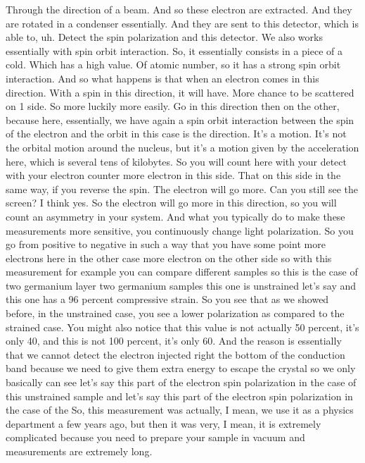 Through the direction of a beam. And so these electron are extracted. And they are rotated in a condenser essentially. And they are sent to this detector, which is able to, uh. Detect the spin polarization and this detector. We also works essentially with spin orbit interaction. So, it essentially consists in a piece of a cold. Which has a high value. Of atomic number, so it has a strong spin orbit interaction. And so what happens is that when an electron comes in this direction. With a spin in this direction, it will have. More chance to be scattered on 1 side. So more luckily more easily. Go in this direction then on the other, because here, essentially, we have again a spin orbit interaction between the spin of the electron and the orbit in this case is the direction. It's a motion. It's not the orbital motion around the nucleus, but it's a motion given by the acceleration here, which is several tens of kilobytes. So you will count here with your detect with your electron counter more electron in this side. That on this side in the same way, if you reverse the spin. The electron will go more. Can you still see the screen? I think yes. So the electron will go more in this direction, so you will count an asymmetry in your system. And what you typically do to make these measurements more sensitive, you continuously change light polarization. So you go from positive to negative in such a way that you have some point more electrons here in the other case more electron on the other side so with this measurement for example you can compare different samples so this is the case of two germanium layer two germanium samples this one is unstrained let's say and this one has a 96 percent compressive strain. So you see that as we showed before, in the unstrained case, you see a lower polarization as compared to the strained case. You might also notice that this value is not actually 50 percent, it's only 40, and this is not 100 percent, it's only 60. And the reason is essentially that we cannot detect the electron injected right the bottom of the conduction band because we need to give them extra energy to escape the crystal so we only basically can see let's say this part of the electron spin polarization in the case of this unstrained sample and let's say this part of the electron spin polarization in the case of the So, this measurement was actually, I mean, we use it as a physics department a few years ago, but then it was very, I mean, it is extremely complicated because you need to prepare your sample in vacuum and measurements are extremely long.

